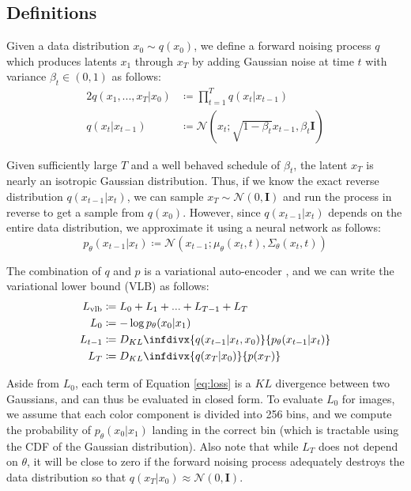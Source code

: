 \documentclass{article}
\newcommand{\kld}[2]{\ensuremath{D_{KL}\infdivx{#1}{#2}}\xspace}
\begin{document}
\subsection{Definitions}

Given a data distribution $x_0 \sim q(x_0)$, we define a forward noising process $q$ which produces latents $x_1$ through $x_T$ by adding Gaussian noise at time $t$ with variance $\beta_t \in (0,1)$ as follows:
\begin{alignat}{2}
    q(x_1, ..., x_T | x_0) &\coloneqq \prod_{t=1}^{T} q(x_t | x_{t-1}) \label{eq:joint} \\
    q(x_t | x_{t-1}) &\coloneqq \mathcal{N}(x_t; \sqrt{1-\beta_t} x_{t-1}, \beta_t \mathbf{I}) \label{eq:singlestep}
\end{alignat}

Given sufficiently large $T$ and a well behaved schedule of $\beta_t$, the latent $x_T$ is nearly an isotropic Gaussian distribution. Thus, if we know the exact reverse distribution $q(x_{t-1}|x_t)$, we can sample $x_T \sim \mathcal{N}(0, \mathbf{I})$ and run the process in reverse to get a sample from $q(x_0)$. However, since $q(x_{t-1}|x_t)$ depends on the entire data distribution, we approximate it using a neural network as follows:
\begin{equation}
\label{eq:nn}
p_{\theta}(x_{t-1}|x_t) \coloneqq \mathcal{N}(x_{t-1}; \mu_{\theta}(x_t, t), \Sigma_{\theta}(x_t, t))
\end{equation}

The combination of $q$ and $p$ is a variational auto-encoder \citep{vae}, and we can write the variational lower bound (VLB) as follows:
\begin{alignat}{2}
    L_{\text{vlb}} &\coloneqq L_0 + L_1 + ... + L_{T-1} + L_T \label{eq:loss} \\
    L_{0} &\coloneqq -\log p_{\theta}(x_0 | x_1) \label{eq:loss0} \\
    L_{t-1} &\coloneqq \kld{q(x_{t-1}|x_t,x_0)}{p_{\theta}(x_{t-1}|x_t)} \label{eq:losst} \\
    L_{T} &\coloneqq \kld{q(x_T | x_0)}{p(x_T)} \label{eq:lossT} 
\end{alignat}

Aside from $L_0$, each term of Equation \ref{eq:loss} is a \ensuremath{KL} divergence between two Gaussians, and can thus be evaluated in closed form. To evaluate $L_0$ for images, we assume that each color component is divided into 256 bins, and we compute the probability of $p_{\theta}(x_0 | x_1)$ landing in the correct bin (which is tractable using the CDF of the Gaussian distribution). Also note that while $L_T$ does not depend on $\theta$, it will be close to zero if the forward noising process adequately destroys the data distribution so that $q(x_T|x_0) \approx \mathcal{N}(0, \mathbf{I})$.
\end{document}
